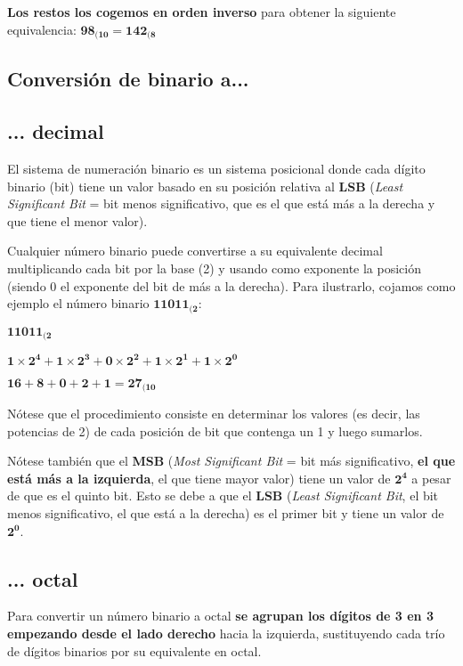 \textbf{Los restos los cogemos en orden inverso} para obtener la siguiente equivalencia: $\mathbf{98_{(10} = 142_{(8}}$


\subsection{Conversión de binario a...}

\subsection*{... decimal}
El sistema de numeración binario es un sistema posicional donde cada dígito binario (bit) tiene un valor basado en su posición relativa al \textbf{LSB} (\textit{Least Significant Bit} = bit menos significativo, que es el que está más a la derecha y que tiene el menor valor).

Cualquier número binario puede convertirse a su equivalente decimal multiplicando cada bit por la base (2) y usando como exponente la posición (siendo 0 el exponente del bit de más a la derecha). Para ilustrarlo, cojamos como ejemplo el número binario $\mathbf{11011_{(2}}$:

\begin{center}
    \vspace{-20pt}

    $ \mathbf{11011_{(2}} $

    $ \mathbf{1\times2^4 + 1\times2^3 + 0\times2^2 + 1\times2^1 + 1\times2^0} $

    $ \mathbf{16 + 8 + 0 + 2 + 1 = 27_{(10}} $
    \vspace{-15pt}
\end{center}

Nótese que el procedimiento consiste en determinar los valores (es decir, las potencias de 2) de cada posición de bit que contenga un 1 y luego sumarlos.

Nótese también que el \textbf{MSB} (\textit{Most Significant Bit} = bit más significativo,\textbf{ el que está más a la izquierda}, el que tiene mayor valor) tiene un valor de $\mathbf{2^4}$ a pesar de que es el quinto bit. Esto se debe a que el \textbf{LSB} (\textit{Least Significant Bit}, el bit menos significativo, el que está a la derecha) es el primer bit y tiene un valor de $\mathbf{2^0}$.

\subsection*{... octal}
Para convertir un número binario a octal \textbf{se agrupan los dígitos de 3 en 3 empezando desde el lado derecho} hacia la izquierda, sustituyendo cada trío de dígitos binarios por su equivalente en octal.

